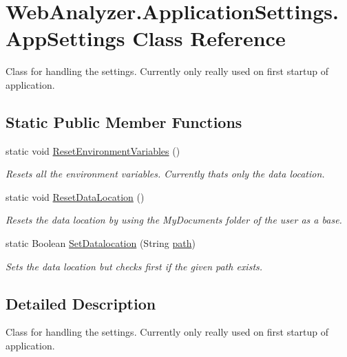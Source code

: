 \hypertarget{class_web_analyzer_1_1_application_settings_1_1_app_settings}{}\section{Web\+Analyzer.\+Application\+Settings.\+App\+Settings Class Reference}
\label{class_web_analyzer_1_1_application_settings_1_1_app_settings}


Class for handling the settings. Currently only really used on first startup of application.  


\subsection*{Static Public Member Functions}
\begin{DoxyCompactItemize}
\item 
static void \hyperlink{class_web_analyzer_1_1_application_settings_1_1_app_settings_a1f60a3d031a0fa24200c06415d11b3b6}{Reset\+Environment\+Variables} ()
\begin{DoxyCompactList}\small\item\em Resets all the environment variables. Currently thats only the data location. \end{DoxyCompactList}\item 
static void \hyperlink{class_web_analyzer_1_1_application_settings_1_1_app_settings_aeb29103a92e6fbf8bd6be79de2294099}{Reset\+Data\+Location} ()
\begin{DoxyCompactList}\small\item\em Resets the data location by using the My\+Documents folder of the user as a base. \end{DoxyCompactList}\item 
static Boolean \hyperlink{class_web_analyzer_1_1_application_settings_1_1_app_settings_a3c885c79ecd2a5c3a47acfa26576101a}{Set\+Datalocation} (String \hyperlink{_u_i_2_h_t_m_l_resources_2js_2src_2create__experiment_8js_aa72e0c8a20e6bcc571d3a1c51846e627}{path})
\begin{DoxyCompactList}\small\item\em Sets the data location but checks first if the given path exists. \end{DoxyCompactList}\end{DoxyCompactItemize}


\subsection{Detailed Description}
Class for handling the settings. Currently only really used on first startup of application. 



